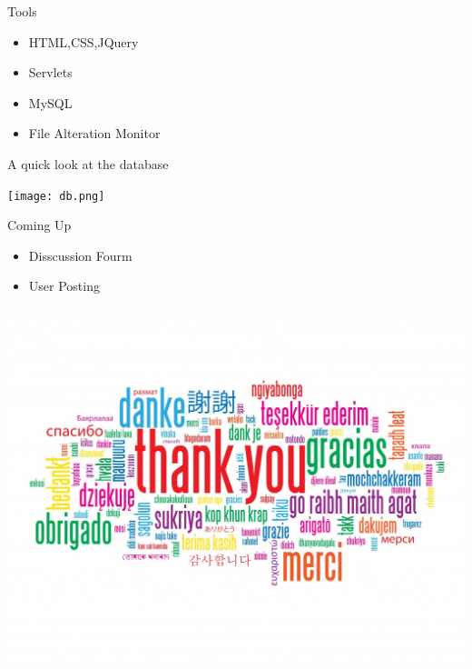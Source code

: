 \documentclass[14pt]{beamer}
\begin{document}
\begin{frame}{Tools}
	\begin{itemize}
		\item HTML,CSS,JQuery
		\item Servlets
		\item MySQL
		\item File Alteration Monitor
	\end{itemize}
\end{frame}


\begin{frame}{A quick look at the database}
	\begin{center}
		\texttt{[image: db.png]}
	\end{center}
\end{frame}

\begin{frame}{Coming Up}
	\begin{itemize}
		\item Disscussion Fourm
		\item User Posting
	\end{itemize}
\end{frame}

\begin{frame}
	\begin{center}
		\includegraphics[scale=0.3]{ty.jpg}
	\end{center}
\end{frame}
\end{document}
